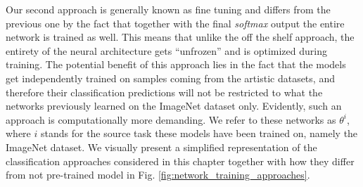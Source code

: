 Our second approach is generally known as fine tuning and differs from the previous one by the fact that together with the final \textit{softmax} output the entire network is trained as well. This means that unlike the off the shelf approach, the entirety of the neural architecture gets ``unfrozen'' and is optimized during training. The potential benefit of this approach lies in the fact that the models get independently trained on samples coming from the artistic datasets, and therefore their classification predictions will not be restricted to what the networks previously learned on the ImageNet dataset only. Evidently, such an approach is computationally more demanding. We refer to these networks as $\theta^{i}$, where $i$ stands for the source task these models have been trained on, namely the ImageNet dataset. We visually present a simplified representation of the classification approaches considered in this chapter together with how they differ from not pre-trained model in Fig. \ref{fig:network_training_approaches}.

